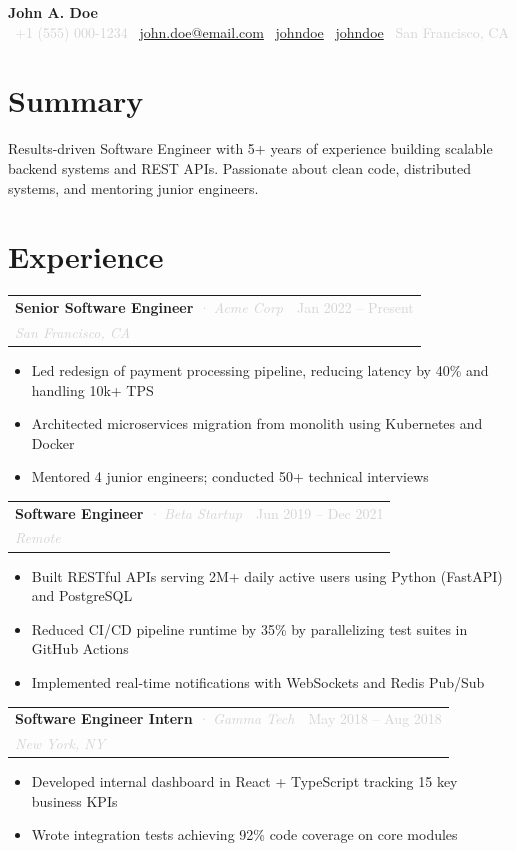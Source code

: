 \documentclass[10pt, letterpaper]{article}
\makeatletter
\newcommand{\resumeHeader}[6]{%
    \begin{center}
        {\Huge\bfseries #1}\\[4pt]
        \small
        \textcolor{lightgray}{%
            \faPhone\ #2 \quad
            \faEnvelope\ \href{mailto:#3}{#3} \quad
            \faLinkedin\ \href{https://linkedin.com/in/#4}{#4} \quad
            \faGithub\ \href{https://github.com/#5}{#5} \quad
            \faMapMarker*\ #6
        }
    \end{center}
    \vspace{2pt}
}
\newcommand{\resumeEntry}[4]{%
    \vspace{3pt}
    \noindent
    \begin{tabularx}{\linewidth}{@{}X r@{}}
        \textbf{#1} \textit{\textcolor{lightgray}{· #2}} & \textcolor{lightgray}{\small #4}\\
        \textit{\textcolor{lightgray}{\small #3}} & \\
    \end{tabularx}
    \vspace{-4pt}
}
\makeatother
\begin{document}

\resumeHeader
    {John A. Doe}
    {+1 (555) 000-1234}
    {john.doe@email.com}
    {johndoe}
    {johndoe}
    {San Francisco, CA}

\section{Summary}
Results-driven Software Engineer with 5+ years of experience building scalable backend systems and
REST APIs. Passionate about clean code, distributed systems, and mentoring junior engineers.

\section{Experience}

\resumeEntry{Senior Software Engineer}{Acme Corp}{San Francisco, CA}{Jan 2022 – Present}
\begin{itemize}
    \item Led redesign of payment processing pipeline, reducing latency by 40\% and handling 10k+ TPS
    \item Architected microservices migration from monolith using Kubernetes and Docker
    \item Mentored 4 junior engineers; conducted 50+ technical interviews
\end{itemize}

\resumeEntry{Software Engineer}{Beta Startup}{Remote}{Jun 2019 – Dec 2021}
\begin{itemize}
    \item Built RESTful APIs serving 2M+ daily active users using Python (FastAPI) and PostgreSQL
    \item Reduced CI/CD pipeline runtime by 35\% by parallelizing test suites in GitHub Actions
    \item Implemented real-time notifications with WebSockets and Redis Pub/Sub
\end{itemize}

\resumeEntry{Software Engineer Intern}{Gamma Tech}{New York, NY}{May 2018 – Aug 2018}
\begin{itemize}
    \item Developed internal dashboard in React + TypeScript tracking 15 key business KPIs
    \item Wrote integration tests achieving 92\% code coverage on core modules
\end{itemize}
\end{document}
